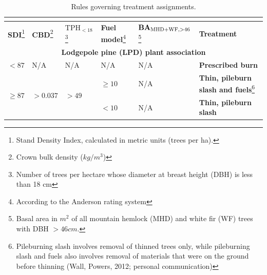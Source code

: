 \begin{longtable}{p{.1\linewidth}p{.1\linewidth}p{.15\linewidth}p{.15\linewidth}p{.2\linewidth}p{.25\linewidth}}
\caption[Rules governing treatment assignments in the Drink.]{Rules governing treatment assignments.} \\
\label{tab:drinkTreatmentRules}\\
\hline
\textbf{SDI}\footnote{Stand Density Index, calculated in metric units (trees per ha).}    & \textbf{CBD}\footnote{Crown bulk density ($kg/m^3$)}   & \textbf{$\text{TPH}_{<18}$}\footnote{Number of trees per hectare whose diameter at breast height (DBH) is less than 18 cm}       & \textbf{Fuel model}\footnote{According to the Anderson rating system\cite{anderson1982aids}}  & $\text{\textbf{BA}}_{\text{MHD+WF,}>46}$\footnote{Basal area in $m^2$ of all mountain hemlock (MHD) and white fir (WF) trees with DBH $> 46 cm$.} & \textbf{Treatment}                                                                \\ \hline
\multicolumn{6}{c}{\textbf{Lodgepole pine (LPD) plant association}}                                                                                                                                                                                                                                                                                                   \\ \hline
$<87$                      & N/A                                                    & N/A                                                 & N/A                  & N/A                                                                                                     & \textbf{Prescribed burn}                                                        \\ \hline
\multirow{2}{*}{$\ge 87$}  & \multirow{2}{*}{$>0.037$}                     & \multirow{2}{*}{$> 49$}                    & $ \ge 10$       & N/A                                                                                                     & \textbf{Thin, pileburn slash and fuels}\footnote{Pileburning slash involves removal of thinned trees only, while pileburning slash and fuels also involves removal of materials that were on the ground before thinning (Wall, Powers, 2012; personal communication)}                                         \\ \cline{4-6} 
                                  &                                                        &                                                     &$< 10$         & N/A                                                                                                     & \textbf{Thin, pileburn slash}                                                     \\ \hline

\end{longtable}
